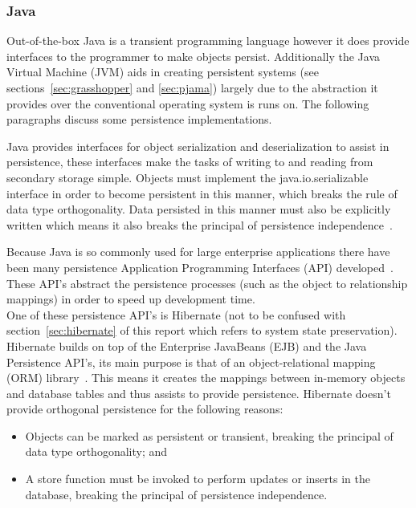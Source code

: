 \documentclass[a4paper,12pt]{article}
\begin{document}
\subsubsection{Java}
Out-of-the-box Java is a transient programming language however it does provide interfaces to the programmer to make objects persist. Additionally the Java Virtual Machine (JVM) aids in creating persistent systems (see sections~\ref{sec:grasshopper} and \ref{sec:pjama}) largely due to the abstraction it provides over the conventional operating system is runs on. The following paragraphs discuss some persistence implementations.
\\\par
Java provides interfaces for object serialization and deserialization to assist in persistence, these interfaces make the tasks of writing to and reading from secondary storage simple. Objects must implement the java.io.serializable interface in order to become persistent in this manner, which breaks the rule of data type orthogonality. Data persisted in this manner must also be explicitly written which means it also breaks the principal of persistence independence~\citep{ADearle}.
\\\par
\label{sec:javahibernate}
Because Java is so commonly used for large enterprise applications there have been many persistence Application Programming Interfaces (API) developed~\citep{persistenceandjava}. These API's abstract the persistence processes (such as the object to relationship mappings) in order to speed up development time. 
\\One of these persistence API's is Hibernate (not to be confused with section~\ref{sec:hibernate} of this report which refers to system state preservation). Hibernate builds on top of the Enterprise JavaBeans (EJB) and the Java Persistence API's, its main purpose is that of an object-relational mapping (ORM) library~\citep{hibernateORM}. This means it creates the mappings between in-memory objects and database tables and thus assists to provide persistence. Hibernate doesn't provide orthogonal persistence for the following reasons:
\begin{itemize}
    \item{Objects can be marked as persistent or transient, breaking the principal of data type orthogonality; and}
    \item{A store function must be invoked to perform updates or inserts in the database, breaking the principal of persistence independence.}
\end{itemize}
\end{document}
